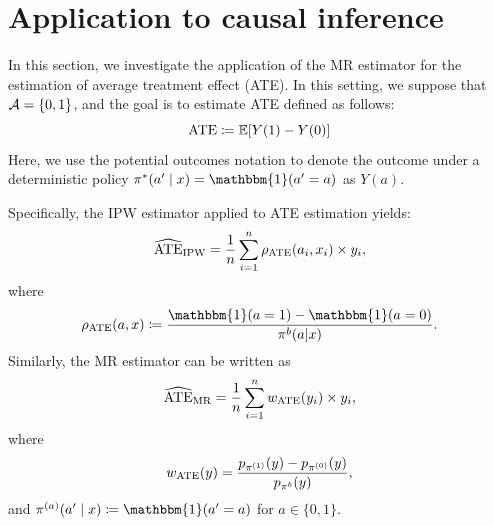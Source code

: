 \section{Application to causal inference}\label{app:causal-inference}
In this section, we investigate the application of the MR estimator for the estimation of average treatment effect (ATE). In this setting, we suppose that $\mathcal{A} = \{0, 1\}$, and the goal is to estimate ATE defined as follows:
\[
\textup{ATE} \coloneqq \mathbb{E}[Y(1)-Y(0)]
\]
Here, we use the potential outcomes notation \citep{robins1986new} to denote the outcome under a deterministic policy $\tar(a'\mid x) = \mathbbm{1}(a'=a)$ as $Y(a)$. 

Specifically, the IPW estimator applied to ATE estimation yields:
\[
\widehat{\textup{ATE}}_{\textup{IPW}} = \frac{1}{n} \sum_{i=1}^n \rho_{\textup{ATE}}(a_i, x_i) \times y_i,
\]
where 
\[
\rho_{\ate}(a, x) \coloneqq \frac{\mathbbm{1}(a=1) - \mathbbm{1}(a=0)}{\beh (a|x)}.
\]
Similarly, the MR estimator can be written as
\[
\widehat{\textup{ATE}}_{\textup{MR}} = \frac{1}{n}\sum_{i=1}^n w_{\textup{ATE}}(y_i)\times y_i, 
\]
where
\[
w_{\textup{ATE}}(y) = \frac{p_{\pi^{(1)}}(y) - p_{\pi^{(0)}}(y)}{p_{\pi^b}(y)},
\] 
and $\pi^{(a)}(a'\mid x) \coloneqq \mathbbm{1}(a'=a)$ for $a\in \{0,1\}$.

